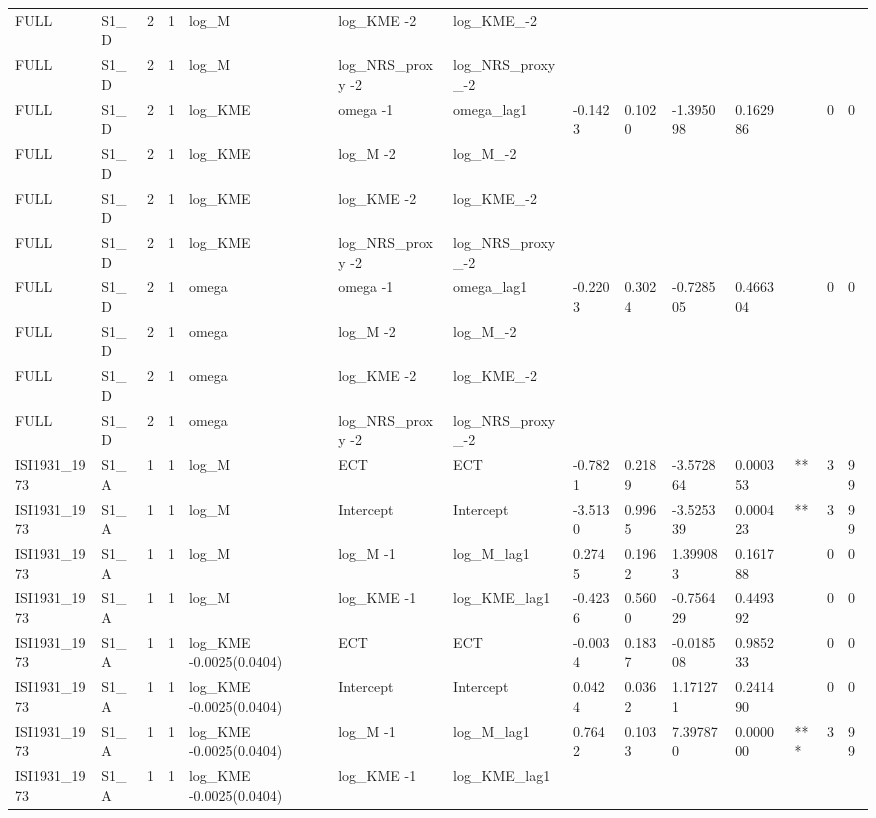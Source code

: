 \begin{tabular}{llllllllllllll}
FULL & S1\_D & 2 & 1 & log\_M & log\_KME -2 & log\_KME\_-2 &  &  &  &  &  &  &  \\
FULL & S1\_D & 2 & 1 & log\_M & log\_NRS\_proxy -2 & log\_NRS\_proxy\_-2 &  &  &  &  &  &  &  \\
FULL & S1\_D & 2 & 1 & log\_KME & omega -1 & omega\_lag1 & -0.1423 & 0.1020 & -1.395098 & 0.162986 &  & 0 & 0 \\
FULL & S1\_D & 2 & 1 & log\_KME & log\_M -2 & log\_M\_-2 &  &  &  &  &  &  &  \\
FULL & S1\_D & 2 & 1 & log\_KME & log\_KME -2 & log\_KME\_-2 &  &  &  &  &  &  &  \\
FULL & S1\_D & 2 & 1 & log\_KME & log\_NRS\_proxy -2 & log\_NRS\_proxy\_-2 &  &  &  &  &  &  &  \\
FULL & S1\_D & 2 & 1 & omega & omega -1 & omega\_lag1 & -0.2203 & 0.3024 & -0.728505 & 0.466304 &  & 0 & 0 \\
FULL & S1\_D & 2 & 1 & omega & log\_M -2 & log\_M\_-2 &  &  &  &  &  &  &  \\
FULL & S1\_D & 2 & 1 & omega & log\_KME -2 & log\_KME\_-2 &  &  &  &  &  &  &  \\
FULL & S1\_D & 2 & 1 & omega & log\_NRS\_proxy -2 & log\_NRS\_proxy\_-2 &  &  &  &  &  &  &  \\
ISI1931\_1973 & S1\_A & 1 & 1 & log\_M & ECT & ECT & -0.7821 & 0.2189 & -3.572864 & 0.000353 & ** & 3 & 99 \\
ISI1931\_1973 & S1\_A & 1 & 1 & log\_M & Intercept & Intercept & -3.5130 & 0.9965 & -3.525339 & 0.000423 & ** & 3 & 99 \\
ISI1931\_1973 & S1\_A & 1 & 1 & log\_M & log\_M -1 & log\_M\_lag1 & 0.2745 & 0.1962 & 1.399083 & 0.161788 &  & 0 & 0 \\
ISI1931\_1973 & S1\_A & 1 & 1 & log\_M & log\_KME -1 & log\_KME\_lag1 & -0.4236 & 0.5600 & -0.756429 & 0.449392 &  & 0 & 0 \\
ISI1931\_1973 & S1\_A & 1 & 1 & log\_KME -0.0025(0.0404) & ECT & ECT & -0.0034 & 0.1837 & -0.018508 & 0.985233 &  & 0 & 0 \\
ISI1931\_1973 & S1\_A & 1 & 1 & log\_KME -0.0025(0.0404) & Intercept & Intercept & 0.0424 & 0.0362 & 1.171271 & 0.241490 &  & 0 & 0 \\
ISI1931\_1973 & S1\_A & 1 & 1 & log\_KME -0.0025(0.0404) & log\_M -1 & log\_M\_lag1 & 0.7642 & 0.1033 & 7.397870 & 0.000000 & *** & 3 & 99 \\
ISI1931\_1973 & S1\_A & 1 & 1 & log\_KME -0.0025(0.0404) & log\_KME -1 & log\_KME\_lag1 &  &  &  &  &  &  &  \\

\end{tabular}
